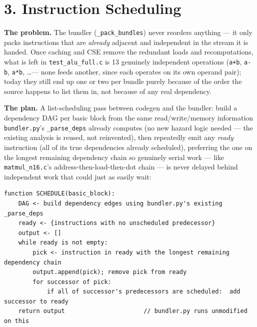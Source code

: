 \documentclass[11pt,a4paper]{article}
\begin{document}
\section{3. Instruction Scheduling}

\textbf{The problem.} The bundler (\texttt{\_pack\_bundles}) never reorders anything --- it
only packs instructions that are \emph{already} adjacent and independent in the stream it
is handed. Once caching and CSE remove the redundant loads and recomputations, what is
left in \texttt{test\_alu\_full.c} is 13 genuinely independent operations (\texttt{a+b},
\texttt{a-b}, \texttt{a*b}, \ldots --- none feeds another, since each operates on its own
operand pair); today they still end up one or two per bundle purely because of the order
the source happens to list them in, not because of any real dependency.

\textbf{The plan.} A list-scheduling pass between codegen and the bundler: build a
dependency DAG per basic block from the same read/write/memory information
\texttt{bundler.py}'s \texttt{\_parse\_deps} already computes (no new hazard logic needed
--- the existing analysis is reused, not reinvented), then repeatedly emit any
\emph{ready} instruction (all of its true dependencies already scheduled), preferring the
one on the longest remaining dependency chain so genuinely serial work --- like
\texttt{matmul\_n16.c}'s address-then-load-then-dot chain --- is never delayed behind
independent work that could just as easily wait:
\begin{lstlisting}[caption={List scheduling --- the rule, not yet implemented}]
function SCHEDULE(basic_block):
    DAG <- build dependency edges using bundler.py's existing _parse_deps
    ready <- {instructions with no unscheduled predecessor}
    output <- []
    while ready is not empty:
        pick <- instruction in ready with the longest remaining dependency chain
        output.append(pick); remove pick from ready
        for successor of pick:
            if all of successor's predecessors are scheduled:  add successor to ready
    return output                      // bundler.py runs unmodified on this
\end{lstlisting}
\end{document}
